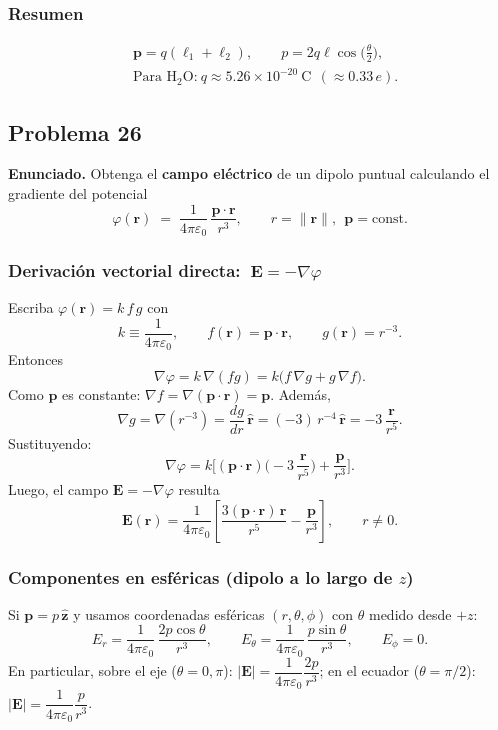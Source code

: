 \documentclass{article}
\begin{document}
\subsubsection*{Resumen}
\[
\boxed{
\begin{aligned}
&\mathbf p = q(\boldsymbol{\ell}_1+\boldsymbol{\ell}_2),\qquad
p = 2q\ell\cos\!\big(\tfrac{\theta}{2}\big),\\[4pt]
&\text{Para H$_2$O:}\ q \approx 5.26\times 10^{-20}\ \mathrm{C} \ \ (\approx 0.33\,e).
\end{aligned}}
\]


\subsection{Problema 26} \vspace{0.5cm}

\textbf{Enunciado.} \; Obtenga el \textbf{campo eléctrico} de un dipolo puntual calculando el gradiente del potencial
\[
\varphi(\mathbf r) \;=\; \frac{1}{4\pi\varepsilon_0}\,\frac{\mathbf p\!\cdot\!\mathbf r}{r^{3}},
\qquad r=\lVert\mathbf r\rVert,\ \ \mathbf p=\text{const.}
\]

\subsubsection*{Derivación vectorial directa: $\ \mathbf E=-\nabla\varphi$}
Escriba $\varphi(\mathbf r)=k\,f\,g$ con
\[
k\equiv\frac{1}{4\pi\varepsilon_0},\qquad
f(\mathbf r)=\mathbf p\!\cdot\!\mathbf r,\qquad
g(\mathbf r)=r^{-3}.
\]
Entonces
\[
\nabla\varphi=k\,\nabla(fg)=k\big(f\,\nabla g+g\,\nabla f\big).
\]
Como $\mathbf p$ es constante: $\nabla f=\nabla(\mathbf p\!\cdot\!\mathbf r)=\mathbf p$.  
Además,
\[
\nabla g=\nabla(r^{-3})=\frac{dg}{dr}\,\hat{\mathbf r}=(-3)\,r^{-4}\,\hat{\mathbf r}
=-3\,\frac{\mathbf r}{r^{5}}.
\]
Sustituyendo:
\[
\nabla\varphi
=k\Big[(\mathbf p\!\cdot\!\mathbf r)\Big(-3\,\frac{\mathbf r}{r^{5}}\Big)
+\frac{\mathbf p}{r^{3}}\Big].
\]
Luego, el campo $\mathbf E=-\nabla\varphi$ resulta
\[
\boxed{\;
\mathbf E(\mathbf r)=\frac{1}{4\pi\varepsilon_0}\left[
\frac{3(\mathbf p\!\cdot\!\mathbf r)\,\mathbf r}{r^{5}}
-\frac{\mathbf p}{r^{3}}
\right],\qquad r\neq 0.\;}
\]

\subsubsection*{Componentes en esféricas (dipolo a lo largo de $z$)}
Si $\mathbf p=p\,\hat{\mathbf z}$ y usamos coordenadas esféricas $(r,\theta,\phi)$ con $\theta$ medido desde $+z$:
\[
\boxed{\;
E_r=\frac{1}{4\pi\varepsilon_0}\,\frac{2p\cos\theta}{r^{3}},\qquad
E_\theta=\frac{1}{4\pi\varepsilon_0}\,\frac{p\sin\theta}{r^{3}},\qquad
E_\phi=0.\;}
\]
En particular, sobre el eje ($\theta=0,\pi$): $|\mathbf E|=\dfrac{1}{4\pi\varepsilon_0}\dfrac{2p}{r^{3}}$;  
en el ecuador ($\theta=\pi/2$): $|\mathbf E|=\dfrac{1}{4\pi\varepsilon_0}\dfrac{p}{r^{3}}$.
\end{document}
